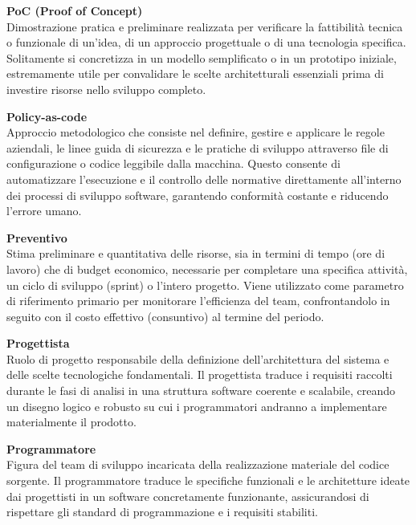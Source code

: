 \documentclass[12pt, a4paper]{article}
\begin{document}
\noindent\hypertarget{poc}{\textbf{PoC (Proof of Concept)}} \\[0.1em]
Dimostrazione pratica e preliminare realizzata per verificare la fattibilità tecnica o funzionale di un'idea, di un approccio progettuale o di una tecnologia specifica. Solitamente si concretizza in un modello semplificato o in un prototipo iniziale, estremamente utile per convalidare le scelte architetturali essenziali prima di investire risorse nello sviluppo completo.
\vspace{0.5cm}

\noindent\hypertarget{policy-as-code}{\textbf{Policy-as-code}} \\[0.1em]
Approccio metodologico che consiste nel definire, gestire e applicare le regole aziendali, le linee guida di sicurezza e le pratiche di sviluppo attraverso file di configurazione o codice leggibile dalla macchina. Questo consente di automatizzare l'esecuzione e il controllo delle normative direttamente all'interno dei processi di sviluppo software, garantendo conformità costante e riducendo l'errore umano.
\vspace{0.5cm}

\noindent\hypertarget{preventivo}{\textbf{Preventivo}} \\[0.1em]
Stima preliminare e quantitativa delle risorse, sia in termini di tempo (ore di lavoro) che di budget economico, necessarie per completare una specifica attività, un ciclo di sviluppo (sprint) o l'intero progetto. Viene utilizzato come parametro di riferimento primario per monitorare l'efficienza del team, confrontandolo in seguito con il costo effettivo (consuntivo) al termine del periodo.
\vspace{0.5cm}

\newpage
\noindent\hypertarget{progettista}{\textbf{Progettista}} \\[0.1em]
Ruolo di progetto responsabile della definizione dell'architettura del sistema e delle scelte tecnologiche fondamentali. Il progettista traduce i requisiti raccolti durante le fasi di analisi in una struttura software coerente e scalabile, creando un disegno logico e robusto su cui i programmatori andranno a implementare materialmente il prodotto.
\vspace{0.5cm}

\noindent\hypertarget{programmatore}{\textbf{Programmatore}} \\[0.1em]
Figura del team di sviluppo incaricata della realizzazione materiale del codice sorgente. Il programmatore traduce le specifiche funzionali e le architetture ideate dai progettisti in un software concretamente funzionante, assicurandosi di rispettare gli standard di programmazione e i requisiti stabiliti.
\vspace{0.5cm}
\end{document}

